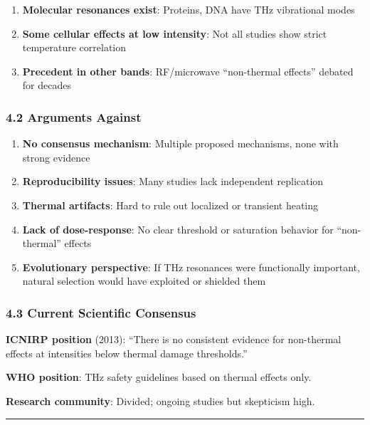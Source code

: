 \begin{enumerate}
\def\labelenumi{\arabic{enumi}.}
\tightlist
\item
  \textbf{Molecular resonances exist}: Proteins, DNA have THz
  vibrational modes
\item
  \textbf{Some cellular effects at low intensity}: Not all studies show
  strict temperature correlation
\item
  \textbf{Precedent in other bands}: RF/microwave ``non-thermal
  effects'' debated for decades
\end{enumerate}

\subsubsection{\texorpdfstring{4.2 Arguments Against
}{4.2 Arguments Against }}\label{arguments-against}

\begin{enumerate}
\def\labelenumi{\arabic{enumi}.}
\tightlist
\item
  \textbf{No consensus mechanism}: Multiple proposed mechanisms, none
  with strong evidence
\item
  \textbf{Reproducibility issues}: Many studies lack independent
  replication
\item
  \textbf{Thermal artifacts}: Hard to rule out localized or transient
  heating
\item
  \textbf{Lack of dose-response}: No clear threshold or saturation
  behavior for ``non-thermal'' effects
\item
  \textbf{Evolutionary perspective}: If THz resonances were functionally
  important, natural selection would have exploited or shielded them
\end{enumerate}

\subsubsection{4.3 Current Scientific
Consensus}\label{current-scientific-consensus}

\textbf{ICNIRP position} (2013): ``There is no consistent evidence for
non-thermal effects at intensities below thermal damage thresholds.''

\textbf{WHO position}: THz safety guidelines based on thermal effects
only.

\textbf{Research community}: Divided; ongoing studies but skepticism
high.

\begin{center}\rule{0.5\linewidth}{0.5pt}\end{center}

